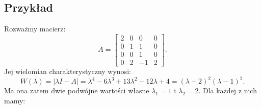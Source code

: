 \documentclass{article}
\begin{document}
\subsection{Przykład}
Rozważmy macierz:
$$
    A 
    =
    \begin{bmatrix}
        2 & 0 &  0 & 0\\
        0 & 1 &  1 & 0\\
        0 & 0 &  1 & 0\\
        0 & 2 & -1 & 2
    \end{bmatrix}.
$$
Jej wielomian charakterystyczny wynosi:
$$
    W(\lambda) = |\lambda I  - A| = \lambda^{4} - 6\lambda^{3} + 13\lambda^{2} - 12\lambda + 4
    = (\lambda - 2)^{2}(\lambda - 1)^{2}.
$$
Ma ona zatem dwie podwójne wartości własne $\lambda_{1} = 1$ i $\lambda_{2}=2$.
Dla każdej z nich mamy:
\end{document}

